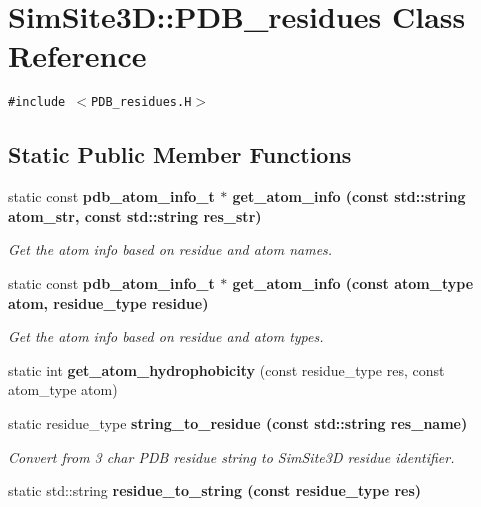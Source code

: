 \section{SimSite3D::PDB\_\-residues Class Reference}
\label{classSimSite3D_1_1PDB__residues}
{\tt \#include $<$PDB\_\-residues.H$>$}

\subsection*{Static Public Member Functions}
\begin{CompactItemize}
\item 
static const \bf{pdb\_\-atom\_\-info\_\-t} $\ast$ \bf{get\_\-atom\_\-info} (const std::string atom\_\-str, const std::string res\_\-str)\label{classSimSite3D_1_1PDB__residues_de442e4bc404da4062cfcd6e454296e1}

\begin{CompactList}\small\item\em Get the atom info based on residue and atom names. \item\end{CompactList}\item 
static const \bf{pdb\_\-atom\_\-info\_\-t} $\ast$ \bf{get\_\-atom\_\-info} (const atom\_\-type atom, residue\_\-type residue)\label{classSimSite3D_1_1PDB__residues_af86442358d5e0e48c2597cc70842a50}

\begin{CompactList}\small\item\em Get the atom info based on residue and atom types. \item\end{CompactList}\item 
static int \textbf{get\_\-atom\_\-hydrophobicity} (const residue\_\-type res, const atom\_\-type atom)\label{classSimSite3D_1_1PDB__residues_4323c94f8f050549e74e8767ae6452eb}

\item 
static residue\_\-type \bf{string\_\-to\_\-residue} (const std::string res\_\-name)\label{classSimSite3D_1_1PDB__residues_08074264e135aee3ba43dcee9a9da5b0}

\begin{CompactList}\small\item\em Convert from 3 char PDB residue string to SimSite3D residue identifier. \item\end{CompactList}\item 
static std::string \bf{residue\_\-to\_\-string} (const residue\_\-type res)\label{classSimSite3D_1_1PDB__residues_d17b8fa8fe06ed333b7d35510ee05b01}


\end{CompactItemize}
